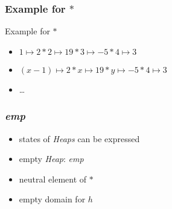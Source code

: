 \documentclass{beamer}
\begin{document}
	\begin{frame}[fragile]
	\frametitle{Example for $\ast$}
	\begin{exampleblock}{Example for $\ast$}
	\begin{minipage}{0.4\textwidth}
	\begin{center}
	\end{center}
	\end{minipage}\noindent
	\begin{minipage}{0.6\textwidth}
		\begin{itemize}
			\item ${1 \mapsto 2} \ast {2 \mapsto 19} \ast {3 \mapsto -5} \ast {4 \mapsto 3}$
			\item ${(x-1) \mapsto 2} \ast {x \mapsto 19} \ast {y \mapsto -5} \ast {4 \mapsto 3}$
			\item \dots
		\end{itemize}
	\end{minipage}
	\end{exampleblock}

	\end{frame}


	\begin{frame}
	\frametitle{\textit{emp}}
	\begin{itemize}
		\item states of \emph{Heaps} can be expressed
		\item empty \emph{Heap}: \textit{emp}
		\item neutral element of $\ast$
		\item empty domain for $h$
	\end{itemize}
	\end{frame}
\end{document}
